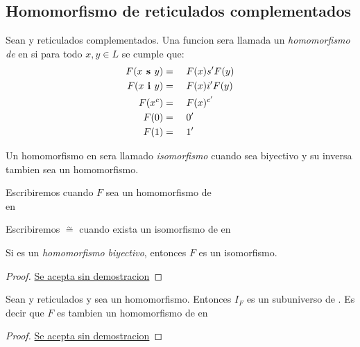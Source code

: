   \subsection{Homomorfismo de reticulados complementados}

  \begin{definition}
    Sean \reticulCompl y  reticulados complementados. Una funcion
     sera llamada un \emph{homomorfismo de} \reticulCompl en 
    si para todo $x, y \in L$ se cumple que:
    \begin{alignat*}{4}
      F(x\textbf{ s }y) &=&\ & F(x) s' F(y)\\
      F(x\textbf{ i }y) &=&\ & F(x) i' F(y)\\
      F(x^c) &=&\ & F(x)^{c'}\\
      F(0) &=&\ & 0'\\
      F(1) &=&\ & 1'
    \end{alignat*}

    Un homomorfismo \reticulCompl en  sera llamado \emph{isomorfismo} cuando
    sea biyectivo y su inversa tambien sea un homomorfismo. 

    Escribiremos  cuando $F$ sea un homomorfismo de\\
    \reticulCompl en 

    Escribiremos \reticulCompl $\overset{\sim}{=}$  cuando exista
    un isomorfismo de \reticulCompl en 
  \end{definition}

  \begin{lemma}
    Si  es un \emph{homomorfismo biyectivo},
    entonces $F$ es un isomorfismo.
  \end{lemma}
  \begin{proof}
    \underline{Se acepta sin demostracion}
  \end{proof}
  \begin{lemma}
    Sean \reticulCompl y  reticulados y sea 
    un homomorfismo. Entonces $I_F$ es un subuniverso de . Es decir que $F$
    es tambien un homomorfismo de \reticulCompl en 
  \end{lemma}
  \begin{proof}
    \underline{Se acepta sin demostracion}
  \end{proof}

